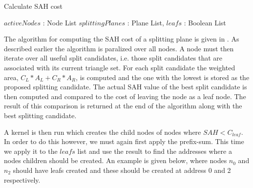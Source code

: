 \begin{algorithm}
  \caption{Calculate SAH cost}
  \label{alg:calcSAHCost}
  \begin{algorithmic}
              {$activeNodes$ : Node List}
              {$splittingPlanes$ : Plane List, $leafs$ : Boolean List}{
                  \ENDFOR
                \ENDFOR
              }
  \end{algorithmic}
\end{algorithm}


The algorithm for computing the SAH cost of a splitting plane is given in
. As described earlier the algorithm is paralized over
all nodes. A node must then iterate over all useful split candidates, i.e. those
split candidates that are associated with its current triangle set. For each
split candidate the weighted area, $C_L * A_L + C_R * A_R$, is computed and the
one with the lowest is stored as the proposed splitting candidate. The actual
SAH value of the best split candidate is then computed and compared to the cost
of leaving the node as a leaf node. The result of this comparison is returned at
the end of the algorithm along with the best splitting candidate.


A kernel is then run which creates the child nodes of nodes where $SAH <
C_{leaf}$. In order to do this however, we must again first apply the
prefix-sum. This time we apply it to the $leafs$ list and use the result to find
the addresses where a nodes children should be created. An example is given
below, where nodes $n_0$ and $n_2$ should have leafs created and these should be
created at address 0 and 2 respectively.

